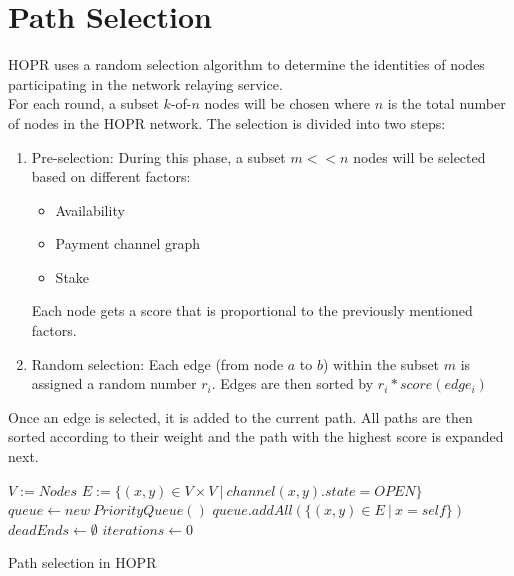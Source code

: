 \section{Path Selection}
HOPR uses a random selection algorithm to determine the identities of nodes participating in the network relaying service.
\\For each round, a subset $k$-of-$n$ nodes will be chosen where $n$ is the total number of nodes in the HOPR network. The selection is divided into two steps:
\begin{enumerate}
    \item Pre-selection:
          During this phase, a subset $m<<n$ nodes will be selected based on different factors:
          \begin{itemize}
              \item Availability
              \item Payment channel graph
              \item Stake
          \end{itemize}
          Each node gets a score that is proportional to the previously mentioned factors.
    \item Random selection:
          Each edge (from node $a$ to $b$) within the subset $m$ is assigned a random number $r_i$. Edges are then sorted by $r_i*score(edge_i)$
\end{enumerate}
Once an edge is selected, it is added to the current path. All paths are then sorted according to their weight and the path with the highest score is expanded next.

\begin{algorithm}
    \SetAlgoNoLine
    \DontPrintSemicolon
    $ V := Nodes$\;
    $ E := \{ (x, y) \in V \times V \ | \ channel(x,y).state = OPEN \}$\;
    \;
    $queue \leftarrow new \ PriorityQueue()$\;
    $queue.addAll(\{ (x,y) \in E \ | \ x = self \})$\;
    $deadEnds \leftarrow \emptyset$\;
    $iterations \leftarrow 0$\;
    \Return{$\bot$}
    \caption{Path selection in HOPR}
\end{algorithm}


